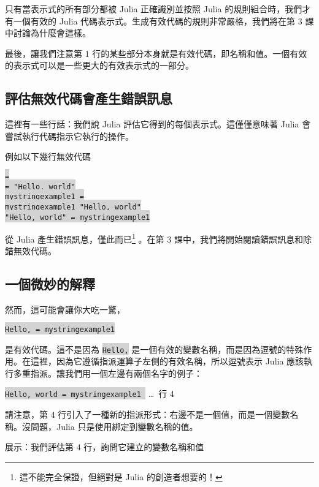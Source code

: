 \documentclass[]{article}
\begin{document}
只有當表示式的所有部分都被 Julia 正確識別並按照 Julia 的規則組合時，我們才有一個有效的 Julia 代碼表示式。生成有效代碼的規則非常嚴格，我們將在第 3 課中討論為什麼會這樣。

最後，讓我們注意第 1 行的某些部分本身就是有效代碼，即名稱和值。一個有效的表示式可以是一些更大的有效表示式的一部分。

\subsection*{評估無效代碼會產生錯誤訊息}
這裡有一些行話：我們說 Julia 評估它得到的每個表示式。這僅僅意味著 Julia 會嘗試執行代碼指示它執行的操作。

例如以下幾行無效代碼

\begin{minipage}{7cm}
	\colorbox{lightgray}{\tt =}\\
	\colorbox{lightgray}{\tt = "Hello, world"}\\
	\colorbox{lightgray}{\tt mystringexample1 =}\\
	\colorbox{lightgray}{\tt mystringexample1 "Hello, world"}\\
	\colorbox{lightgray}{\tt "Hello, world" = mystringexample1}
\end{minipage}

從 Julia 產生錯誤訊息，僅此而已\footnote{這不能完全保證，但絕對是 Julia 的創造者想要的！} 。在第 3 課中，我們將開始閱讀錯誤訊息和除錯無效代碼。

\subsection*{一個微妙的解釋}

然而，這可能會讓你大吃一驚，

\colorbox{lightgray}{\tt Hello, = mystringexample1}

是有效代碼。這不是因為 \colorbox{lightgray}{\tt Hello,} 是一個有效的變數名稱，而是因為逗號的特殊作用。在這裡，因為它遵循指派運算子左側的有效名稱，所以逗號表示 Julia 應該執行多重指派。讓我們用一個左邊有兩個名字的例子：

\colorbox{lightgray}{\tt Hello, world = mystringexample1 } \hspace{4.5cm} \ldots\ 行 4

\begin{minipage}[t]{8cm}
請注意，第 4 行引入了一種新的指派形式：右邊不是一個值，而是一個變數名稱。沒問題，Julia 只是使用綁定到變數名稱的值。
\end{minipage}
\hfill
\begin{minipage}[t]{6cm}
展示：我們評估第 4 行，詢問它建立的變數名稱和值
\end{minipage}
\end{document}
